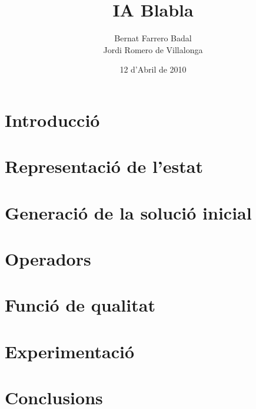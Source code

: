 \documentclass[a4paper]{report}
\author{Bernat Farrero Badal \\Jordi Romero de Villalonga}
\title{IA Blabla}
\date{12 d'Abril de 2010}
\begin{document}
\maketitle

\tableofcontents

\newpage

\chapter{Introducció}


\chapter{Representació de l'estat}


\chapter{Generació de la solució inicial}


\chapter{Operadors}


\chapter{Funció de qualitat}


\chapter{Experimentació}


\chapter{Conclusions}

\end{document}

